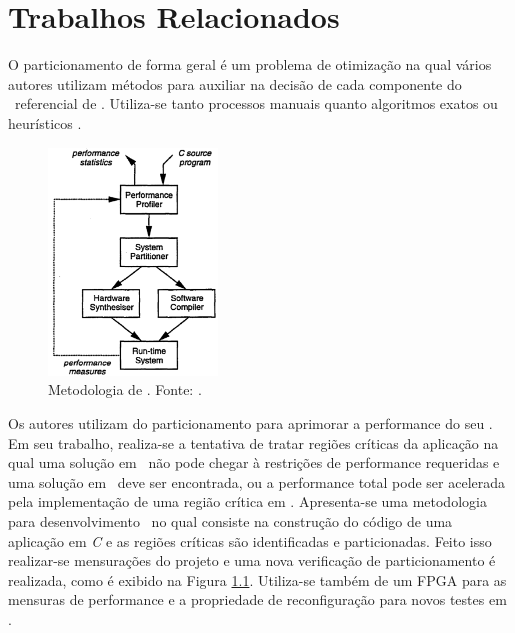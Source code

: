 \chapter{Trabalhos Relacionados} \label{chap:relacionados}


	O particionamento de forma geral é um problema de otimização na qual vários autores utilizam métodos para auxiliar na decisão de cada componente do \design\ referencial de \software. 
   Utiliza-se tanto processos manuais quanto algoritmos exatos ou heurísticos \citep{Arato2005}.

	\begin{figure} \centering
    	\vspace{-20pt}
		\includegraphics[width=0.4\textwidth]{img/rt-edwards_method.png}
        \vspace{-10pt}
		\caption{Metodologia de \codesign. Fonte: \citet{Edwards1994}.}
		\label{fig:tr-edwards_method}
	\end{figure}

   Os autores \citet{Edwards1994} utilizam do particionamento para aprimorar a performance do seu \software. 
   Em seu trabalho, realiza-se a tentativa de tratar regiões críticas da aplicação na qual uma solução em \software\ não pode chegar à restrições de performance requeridas e uma solução em \hardware\ deve ser encontrada, ou a performance total pode ser acelerada pela implementação de uma região crítica em \hardware.
   Apresenta-se uma metodologia para desenvolvimento \codesign\ no qual consiste na construção do código de uma aplicação em \textit{C} e as regiões críticas são identificadas e particionadas. 
   Feito isso realizar-se mensurações do projeto e uma nova verificação de particionamento é realizada, como é exibido na Figura \ref{fig:tr-edwards_method}.
   Utiliza-se também de um FPGA para as mensuras de performance e a propriedade de reconfiguração para novos testes em \hardware.
   
